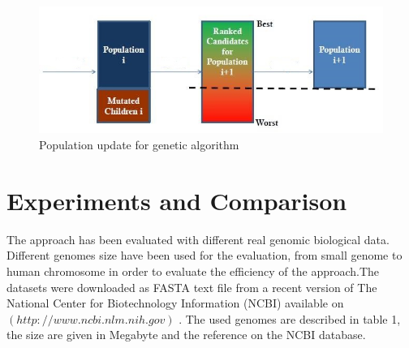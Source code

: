 \documentclass[preprint,12pt]{elsarticle}
\begin{document}
\begin{figure}[tbph]
\begin{center}
\includegraphics[scale=0.7]{Images/Drawing_1.jpg}
\caption{Population update for genetic algorithm}
\end{center}
\label{Fig2}
\end{figure}


\section{Experiments and Comparison}
The approach has been evaluated with different real genomic biological data. Different genomes size have been used for the evaluation, from small genome to human chromosome in order to evaluate the efficiency of the approach.The datasets were downloaded as FASTA text file from a recent version of The National Center for Biotechnology Information (NCBI) available on $(http://www.ncbi.nlm.nih.gov)$ \cite{pruitt2009ncbi}. The used genomes are described in table 1, the size are given in Megabyte and the reference on the NCBI database.
\end{document}
